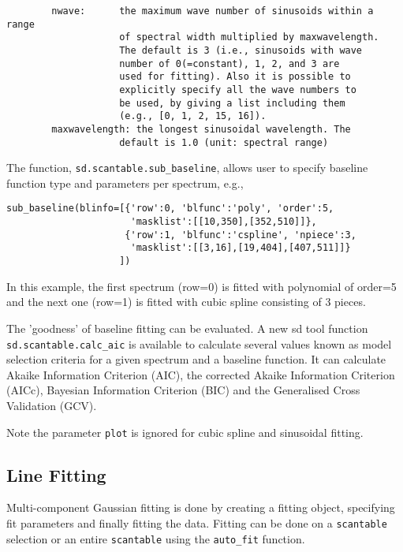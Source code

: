 \small
\begin{verbatim}
        nwave:      the maximum wave number of sinusoids within a range 
                    of spectral width multiplied by maxwavelength.
                    The default is 3 (i.e., sinusoids with wave 
                    number of 0(=constant), 1, 2, and 3 are 
                    used for fitting). Also it is possible to 
                    explicitly specify all the wave numbers to 
                    be used, by giving a list including them 
                    (e.g., [0, 1, 2, 15, 16]).
        maxwavelength: the longest sinusoidal wavelength. The 
                    default is 1.0 (unit: spectral range)
\end{verbatim}
\normalsize

The function, {\tt sd.scantable.sub\_baseline}, allows user to specify
baseline function type and parameters per spectrum, e.g.,
\small
\begin{verbatim}
sub_baseline(blinfo=[{'row':0, 'blfunc':'poly', 'order':5,
                      'masklist':[[10,350],[352,510]]},
                     {'row':1, 'blfunc':'cspline', 'npiece':3,
                      'masklist':[[3,16],[19,404],[407,511]]}
                    ])
\end{verbatim}
\normalsize
In this example, the first spectrum (row=0) is fitted with polynomial
of order=5 and the next one (row=1) is fitted with cubic spline
consisting of 3 pieces.


The 'goodness' of baseline fitting can be evaluated. A new sd tool function {\tt sd.scantable.calc\_aic} is available to calculate several values known as model selection criteria for a given spectrum and a baseline function. It can calculate Akaike Information Criterion (AIC), the corrected Akaike Information Criterion (AICc), Bayesian Information Criterion (BIC) and the Generalised Cross Validation (GCV). 


Note the parameter {\tt plot} is ignored for cubic spline and sinusoidal
fitting. 

\subsection{Line Fitting}
\label{subsection:sd.asap.LINEfitting}

Multi-component Gaussian fitting is done by
creating a fitting object, specifying fit parameters and finally
fitting the data. Fitting can be done on a {\tt scantable} selection
or an entire {\tt scantable} using the {\tt auto\_fit} function.

